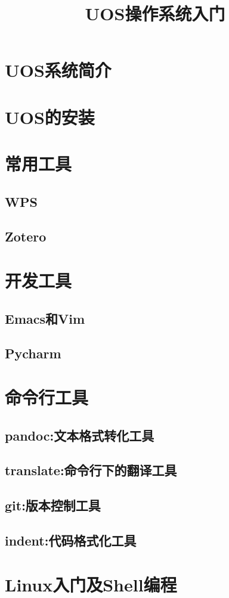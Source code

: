\documentclass{article}
\title{UOS操作系统入门}
\begin{document}
\maketitle
\tableofcontents


\section{UOS系统简介}


\section{UOS的安装}
\label{sec:02}

\section{常用工具}
\label{sec:03}

\subsection{WPS}
\label{sec:0301}
\subsection{Zotero}
\label{sec:0302}

\section{开发工具}
\label{sec:04}

\subsection{Emacs和Vim}
\label{sec:0401}

\subsection{Pycharm}
\label{sec:0402}


\section{命令行工具}
\label{sec:05}

\subsection{pandoc:文本格式转化工具}
\label{sec:0501}

\subsection{translate:命令行下的翻译工具}
\label{sec:0502}

\subsection{git:版本控制工具}
\label{sec:0503}

\subsection{indent:代码格式化工具}
\label{sec:0504}




\section{Linux入门及Shell编程}
\label{sec:06}
\end{document}
